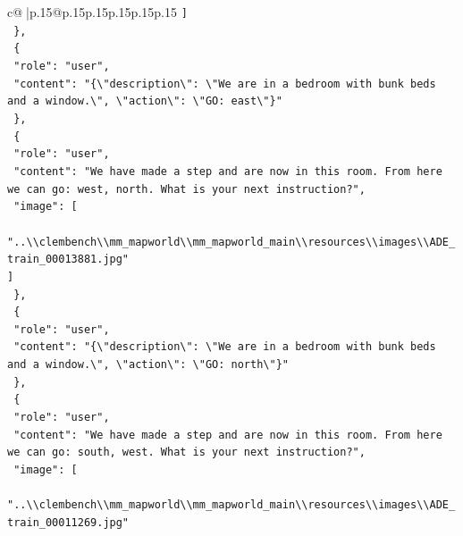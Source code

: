 \documentclass{article}
\begin{document}
{\begin{supertabular}{c@{$\;$}|p{.15\linewidth}@{}p{.15\linewidth}p{.15\linewidth}p{.15\linewidth}p{.15\linewidth}p{.15\linewidth}}
{{{\texttt{    {]}} \\
\texttt{  \},} \\
\texttt{  \{} \\
\texttt{    "role": "user",} \\
\texttt{    "content": "\{\textbackslash{}"description\textbackslash{}": \textbackslash{}"We are in a bedroom with bunk beds and a window.\textbackslash{}", \textbackslash{}"action\textbackslash{}": \textbackslash{}"GO: east\textbackslash{}"\}"} \\
\texttt{  \},} \\
\texttt{  \{} \\
\texttt{    "role": "user",} \\
\texttt{    "content": "We have made a step and are now in this room. From here we can go: west, north. What is your next instruction?",} \\
\texttt{    "image": {[}} \\
\texttt{      "..\textbackslash{}\textbackslash{}clembench\textbackslash{}\textbackslash{}mm\_mapworld\textbackslash{}\textbackslash{}mm\_mapworld\_main\textbackslash{}\textbackslash{}resources\textbackslash{}\textbackslash{}images\textbackslash{}\textbackslash{}ADE\_train\_00013881.jpg"} \\
\texttt{    {]}} \\
\texttt{  \},} \\
\texttt{  \{} \\
\texttt{    "role": "user",} \\
\texttt{    "content": "\{\textbackslash{}"description\textbackslash{}": \textbackslash{}"We are in a bedroom with bunk beds and a window.\textbackslash{}", \textbackslash{}"action\textbackslash{}": \textbackslash{}"GO: north\textbackslash{}"\}"} \\
\texttt{  \},} \\
\texttt{  \{} \\
\texttt{    "role": "user",} \\
\texttt{    "content": "We have made a step and are now in this room. From here we can go: south, west. What is your next instruction?",} \\
\texttt{    "image": {[}} \\
\texttt{      "..\textbackslash{}\textbackslash{}clembench\textbackslash{}\textbackslash{}mm\_mapworld\textbackslash{}\textbackslash{}mm\_mapworld\_main\textbackslash{}\textbackslash{}resources\textbackslash{}\textbackslash{}images\textbackslash{}\textbackslash{}ADE\_train\_00011269.jpg"} \\
}}}
\end{supertabular}}
\end{document}
